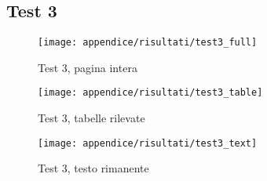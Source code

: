 \newpage
\subsection{Test 3}
\label{sec:good-test}
\begin{figure}[H] 
    \centering
    \texttt{[image: appendice/risultati/test3\_full]} 
    \caption{Test 3, pagina intera}
    \label{img:test-0-full}
\end{figure} 
\newpage
\begin{figure}[H]  
        \centering  
        \texttt{[image: appendice/risultati/test3\_table]}  
        \caption{Test 3, tabelle rilevate}
\end{figure}
\begin{figure}[H]
        \centering  
        \texttt{[image: appendice/risultati/test3\_text]}  
        \caption{Test 3, testo rimanente}
\end{figure}%
